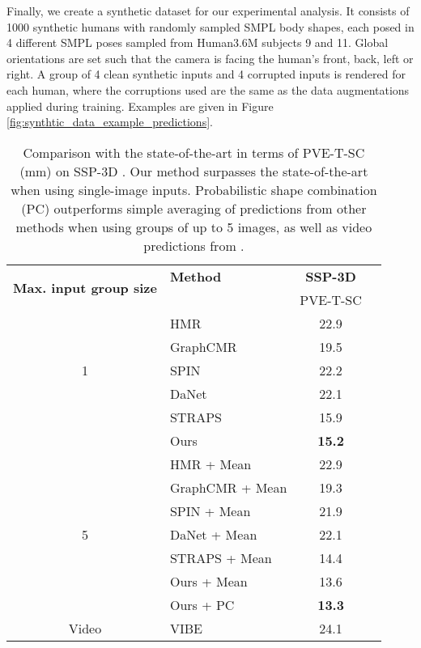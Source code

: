 \documentclass[final]{cvpr}
\begin{document}
Finally, we create a synthetic dataset for our experimental analysis. It consists of 1000 synthetic humans with randomly sampled SMPL body shapes, each posed in 4 different SMPL poses sampled from Human3.6M \cite{h36m_pami} subjects 9 and 11. Global orientations are set such that the camera is facing the human's front, back, left or right. A group of 4 clean synthetic inputs and 4 corrupted inputs is rendered for each human, where the corruptions used are the same as the data augmentations applied during training. Examples are given in Figure \ref{fig:synthtic_data_example_predictions}.

\begin{table}[t]
\centering
\small
\begin{tabular}{c l c c} 
 \hline
 \multirow{2}{0.23\linewidth}{\textbf{Max. input group size}} & \textbf{Method} & \textbf{SSP-3D}\\
 & & PVE-T-SC\\ [0.5ex] 
 \hline
 & HMR \cite{hmrKanazawa17} & 22.9\\
 & GraphCMR \cite{kolotouros2019cmr} & 19.5\\
  \large 1 & SPIN \cite{kolotouros2019spin} & 22.2\\
 & DaNet \cite{zhang2019danet} & 22.1\\
 & STRAPS \cite{STRAPS2020BMVC} & 15.9\\
 & Ours & \textbf{15.2}\\
 \hline
 & HMR \cite{hmrKanazawa17} + Mean & 22.9\\
 & GraphCMR \cite{kolotouros2019cmr} + Mean & 19.3\\
 & SPIN \cite{kolotouros2019spin} + Mean & 21.9\\
 \large 5 & DaNet \cite{zhang2019danet} + Mean & 22.1\\
 & STRAPS \cite{STRAPS2020BMVC} + Mean & 14.4 \\
 & Ours + Mean & 13.6\\
& Ours + PC & \textbf{13.3}\\
 \hline
 Video & VIBE \cite{kocabas2019vibe} & 24.1\\
 \hline
\end{tabular}
\caption{Comparison with the state-of-the-art in terms of PVE-T-SC (mm) on SSP-3D \cite{STRAPS2020BMVC}. Our method surpasses the state-of-the-art when using single-image inputs. Probabilistic shape combination (PC) outperforms simple averaging of predictions from other methods when using groups of up to 5 images, as well as video predictions from \cite{kocabas2019vibe}.}
\label{table:ssp3d_sota_comparison}
\end{table}
\end{document}
